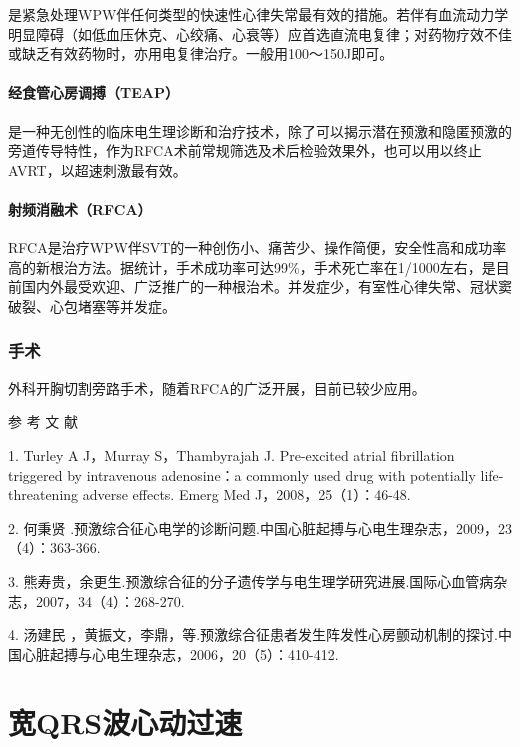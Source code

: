 是紧急处理WPW伴任何类型的快速性心律失常最有效的措施。若伴有血流动力学明显障碍（如低血压休克、心绞痛、心衰等）应首选直流电复律；对药物疗效不佳或缺乏有效药物时，亦用电复律治疗。一般用100～150J即可。

\paragraph{经食管心房调搏（TEAP）}

是一种无创性的临床电生理诊断和治疗技术，除了可以揭示潜在预激和隐匿预激的旁道传导特性，作为RFCA术前常规筛选及术后检验效果外，也可以用以终止AVRT，以超速刺激最有效。

\paragraph{射频消融术（RFCA）}

RFCA是治疗WPW伴SVT的一种创伤小、痛苦少、操作简便，安全性高和成功率高的新根治方法。据统计，手术成功率可达99\%，手术死亡率在1/1000左右，是目前国内外最受欢迎、广泛推广的一种根治术。并发症少，有室性心律失常、冠状窦破裂、心包堵塞等并发症。

\subsubsection{手术}

外科开胸切割旁路手术，随着RFCA的广泛开展，目前已较少应用。

\hypertarget{text00294.htmlux5cux23CHP10-2-7-4}{}
参 考 文 献

1. Turley A J，Murray S，Thambyrajah J. Pre-excited atrial fibrillation
triggered by intravenous adenosine：a commonly used drug with
potentially life-threatening adverse effects. Emerg Med
J，2008，25（1）：46-48.

2. 何秉贤
.预激综合征心电学的诊断问题.中国心脏起搏与心电生理杂志，2009，23（4）：363-366.

3.
熊寿贵，余更生.预激综合征的分子遗传学与电生理学研究进展.国际心血管病杂志，2007，34（4）：268-270.

4. 汤建民
，黄振文，李鼎，等.预激综合征患者发生阵发性心房颤动机制的探讨.中国心脏起搏与心电生理杂志，2006，20（5）：410-412.

\protect\hypertarget{text00295.html}{}{}

\section{宽QRS波心动过速}

